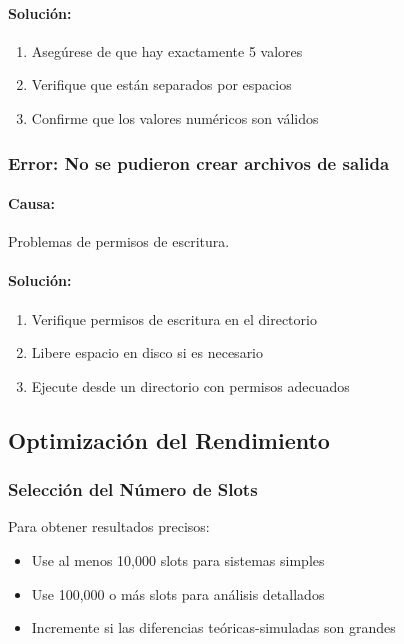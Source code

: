 \documentclass{article}
\begin{document}
\paragraph{Solución:}
\begin{enumerate}
    \item Asegúrese de que hay exactamente 5 valores
    \item Verifique que están separados por espacios
    \item Confirme que los valores numéricos son válidos
\end{enumerate}

\subsubsection{Error: No se pudieron crear archivos de salida}
\paragraph{Causa:} Problemas de permisos de escritura.
\paragraph{Solución:}
\begin{enumerate}
    \item Verifique permisos de escritura en el directorio
    \item Libere espacio en disco si es necesario
    \item Ejecute desde un directorio con permisos adecuados
\end{enumerate}

\subsection{Optimización del Rendimiento}

\subsubsection{Selección del Número de Slots}
Para obtener resultados precisos:
\begin{itemize}
    \item Use al menos 10,000 slots para sistemas simples
    \item Use 100,000 o más slots para análisis detallados
    \item Incremente si las diferencias teóricas-simuladas son grandes
\end{itemize}
\end{document}
